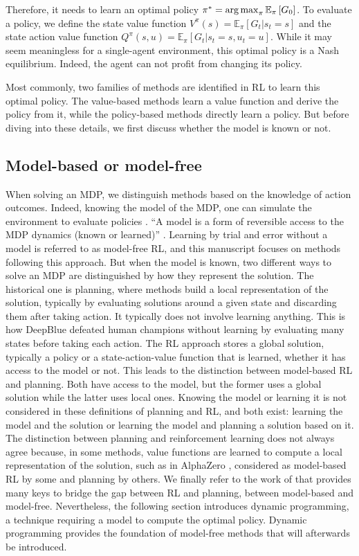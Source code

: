 Therefore, it needs to learn an optimal policy $\pi^*=\operatorname*{arg\,max}_\pi \mathbb{E}_{\pi}\left[ G_0 \right]$.
To evaluate a policy, we define the state value function $V^\pi(s) = \mathbb{E}_{\pi}\left[G_t|s_t=s\right]$ and the state action value function $Q^\pi(s, u) = \mathbb{E}_{\pi}\left[G_t|s_t=s, u_t=u\right]$.
While it may seem meaningless for a single-agent environment, this optimal policy is a Nash equilibrium.
Indeed, the agent can not profit from changing its policy.

Most commonly, two families of methods are identified in RL to learn this optimal policy.
The value-based methods learn a value function and derive the policy from it, while the policy-based methods directly learn a policy.
But before diving into these details, we first discuss whether the model is known or not.

\subsection{Model-based or model-free}
\label{sec:ch2_model_based_vs_model_free}

When solving an MDP, we distinguish methods based on the knowledge of action outcomes.
Indeed, knowing the model of the MDP, one can simulate the environment to evaluate policies \citep{sutton2018reinforcement}.
``A model is a form of reversible access to the MDP dynamics (known or learned)'' \citep{moerland2023model}.
Learning by trial and error without a model is referred to as model-free RL, and this manuscript focuses on methods following this approach.
But when the model is known, two different ways to solve an MDP are distinguished by how they represent the solution.
The historical one is planning, where methods build a local representation of the solution, typically by evaluating solutions around a given state and discarding them after taking action.
It typically does not involve learning anything.
This is how DeepBlue \citep{campbell2002deep} defeated human champions without learning by evaluating many states before taking each action.
The RL approach stores a global solution, typically a policy or a state-action-value function that is learned, whether it has access to the model or not.
This leads to the distinction between model-based RL and planning.
Both have access to the model, but the former uses a global solution while the latter uses local ones.
Knowing the model or learning it is not considered in these definitions of planning and RL, and both exist: learning the model and the solution or learning the model and planning a solution based on it.
The distinction between planning and reinforcement learning does not always agree because, in some methods, value functions are learned to compute a local representation of the solution, such as in AlphaZero \citep{silver2018general}, considered as model-based RL by some and planning by others.
We finally refer to the work of \cite{moerland2023model} that provides many keys to bridge the gap between RL and planning, between model-based and model-free.
Nevertheless, the following section introduces dynamic programming, a technique requiring a model to compute the optimal policy.
Dynamic programming provides the foundation of model-free methods that will afterwards be introduced.


